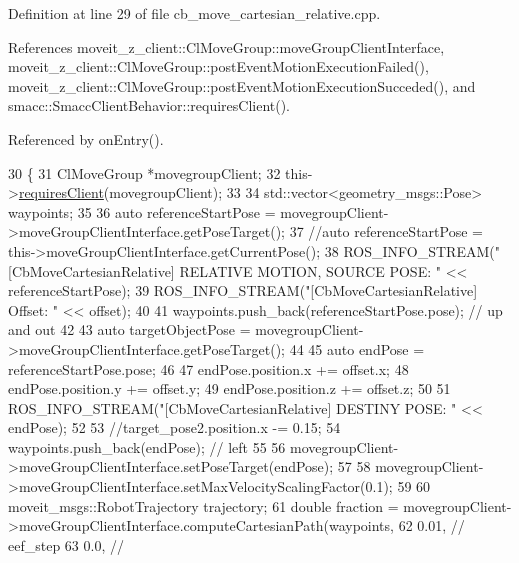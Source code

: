Definition at line 29 of file cb\+\_\+move\+\_\+cartesian\+\_\+relative.\+cpp.



References moveit\+\_\+z\+\_\+client\+::\+Cl\+Move\+Group\+::move\+Group\+Client\+Interface, moveit\+\_\+z\+\_\+client\+::\+Cl\+Move\+Group\+::post\+Event\+Motion\+Execution\+Failed(), moveit\+\_\+z\+\_\+client\+::\+Cl\+Move\+Group\+::post\+Event\+Motion\+Execution\+Succeded(), and smacc\+::\+Smacc\+Client\+Behavior\+::requires\+Client().



Referenced by on\+Entry().


\begin{DoxyCode}
30 \{
31     ClMoveGroup *movegroupClient;
32     this->\hyperlink{classsmacc_1_1SmaccClientBehavior_a917f001e763a1059af337bf4e164f542}{requiresClient}(movegroupClient);
33 
34     std::vector<geometry\_msgs::Pose> waypoints;
35 
36     \textcolor{keyword}{auto} referenceStartPose = movegroupClient->moveGroupClientInterface.getPoseTarget();
37     \textcolor{comment}{//auto referenceStartPose = this->moveGroupClientInterface.getCurrentPose();}
38     ROS\_INFO\_STREAM(\textcolor{stringliteral}{"[CbMoveCartesianRelative] RELATIVE MOTION, SOURCE POSE: "} << referenceStartPose);
39     ROS\_INFO\_STREAM(\textcolor{stringliteral}{"[CbMoveCartesianRelative] Offset: "} << offset);
40 
41     waypoints.push\_back(referenceStartPose.pose); \textcolor{comment}{// up and out}
42 
43     \textcolor{keyword}{auto} targetObjectPose = movegroupClient->moveGroupClientInterface.getPoseTarget();
44 
45     \textcolor{keyword}{auto} endPose = referenceStartPose.pose;
46 
47     endPose.position.x += offset.x;
48     endPose.position.y += offset.y;
49     endPose.position.z += offset.z;
50 
51     ROS\_INFO\_STREAM(\textcolor{stringliteral}{"[CbMoveCartesianRelative] DESTINY POSE: "} << endPose);
52 
53     \textcolor{comment}{//target\_pose2.position.x -= 0.15;}
54     waypoints.push\_back(endPose); \textcolor{comment}{// left}
55 
56     movegroupClient->moveGroupClientInterface.setPoseTarget(endPose);
57 
58     movegroupClient->moveGroupClientInterface.setMaxVelocityScalingFactor(0.1);
59 
60     moveit\_msgs::RobotTrajectory trajectory;
61     \textcolor{keywordtype}{double} fraction = movegroupClient->moveGroupClientInterface.computeCartesianPath(waypoints,
62                                                                                      0.01, \textcolor{comment}{// eef\_step}
63                                                                                      0.0,  \textcolor{comment}{//
}
\end{DoxyCode}
